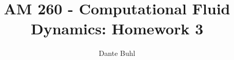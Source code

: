 \documentclass{article}
\begin{document}
\title{AM 260 - Computational Fluid Dynamics: Homework 3}
\author{Dante Buhl}


\newcommand{\wrms}{w_{\text{rms}}}
\newcommand{\bs}[1]{\boldsymbol{#1}}
\newcommand{\tb}[1]{\textbf{#1}}
\newcommand{\bmp}[1]{\begin{minipage}{#1\textwidth}}
\newcommand{\emp}{\end{minipage}}
\newcommand{\R}{\mathbb{R}}
\newcommand{\C}{\mathbb{C}}
\newcommand{\N}{\mathcal{N}}
\newcommand{\m}{\bs{\mu}_*}
\newcommand{\s}{\bs{\Sigma}_*}
\newcommand{\dt}{\Delta t}
\newcommand{\dx}{\Delta x}
\newcommand{\tr}[1]{\text{Tr}(#1)}
\newcommand{\Tr}[1]{\text{Tr}(#1)}
\newcommand{\Div}{\nabla \cdot}
\renewcommand{\div}{\nabla \cdot}
\newcommand{\Curl}{\nabla \times}
\newcommand{\Grad}{\nabla}
\newcommand{\grad}{\nabla}
\newcommand{\grads}{\nabla_s}
\newcommand{\gradf}{\nabla_f}
\newcommand{\xs}{x_s}
\newcommand{\x}{\bs{x}}
\newcommand{\xf}{x_f}
\newcommand{\ts}{t_s}
\newcommand{\tf}{t_f}
\newcommand{\pt}{\partial t}
\newcommand{\pz}{\partial z}
\newcommand{\uvec}{\bs{u}}
\newcommand{\bvec}{\bs{B}}
\newcommand{\nvec}{\hat{\bs{n}}}
\newcommand{\tu}{\tilde{\uvec}}
\newcommand{\B}{\bs{B}}
\newcommand{\A}{\bs{A}}
\newcommand{\jvec}{\bs{j}}
\newcommand{\F}{\bs{F}}
\newcommand{\T}{\tilde{T}}
\newcommand{\ez}{\bs{e}_z}
\newcommand{\ex}{\bs{e}_x}
\newcommand{\ey}{\bs{e}_y}
\newcommand{\eo}{\bs{e}_{\bs{\Omega}}}
\newcommand{\ppt}[1]{\frac{\partial #1}{\partial t}}
\newcommand{\pp}[2]{\frac{\partial #1}{\partial #2}}
\newcommand{\pptwo}[2]{\frac{\partial^2 #1}{\partial #2^2}}
\newcommand{\ddtwo}[2]{\frac{d^2 #1}{d #2^2}}
\newcommand{\DDt}[1]{\frac{D #1}{D t}}
\newcommand{\ppts}[1]{\frac{\partial #1}{\partial t_s}}
\newcommand{\pptf}[1]{\frac{\partial #1}{\partial t_f}}
\newcommand{\ppz}[1]{\frac{\partial #1}{\partial z}}
\newcommand{\ddz}[1]{\frac{d #1}{d z}}
\newcommand{\ppzetas}[1]{\frac{\partial^2 #1}{\partial \zeta^2}}
\newcommand{\ppzs}[1]{\frac{\partial #1}{\partial z_s}}
\newcommand{\ppzf}[1]{\frac{\partial #1}{\partial z_f}}
\newcommand{\ppx}[1]{\frac{\partial #1}{\partial x}}
\newcommand{\ddx}[1]{\frac{d #1}{d x}}
\newcommand{\ppxi}[1]{\frac{\partial #1}{\partial x_i}}
\newcommand{\ppxj}[1]{\frac{\partial #1}{\partial x_j}}
\newcommand{\ppy}[1]{\frac{\partial #1}{\partial y}}
\newcommand{\ppzeta}[1]{\frac{\partial #1}{\partial \zeta}}
\renewcommand{\k}{\bs{k}}
\newcommand{\real}[1]{\text{Re}\left[#1\right]}


\maketitle 
\setlength{\parindent}{0pt}
\end{document}
